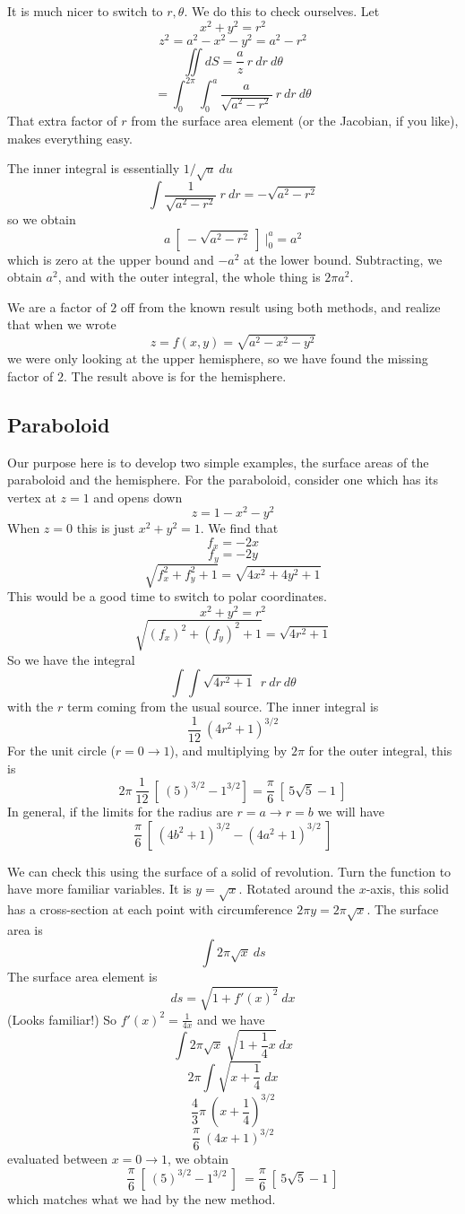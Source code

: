 \documentclass[11pt, oneside]{article}   	%
\begin{document}
It is much nicer to switch to $r,\theta$.  We do this to check ourselves. Let
\[ x^2 + y^2 = r^2 \]
\[ z^2 = a^2 - x^2 - y^2 = a^2 - r^2 \]
\[ \iint dS = \frac{a}{z} \ r \ dr \ d \theta \]
\[ = \int_0^{2 \pi} \int_0^a  \frac{a}{\sqrt{a^2 - r^2}} \ r \ dr \ d \theta \]
That extra factor of $r$ from the surface area element (or the Jacobian, if you like), makes everything easy.

The inner integral is essentially $1/\sqrt{u} \ du$
\[ \int \frac{1}{\sqrt{a^2 - r^2}} \ r \ dr = -\sqrt{a^2 - r^2}  \]
so we obtain
\[ a \ [ \ -\sqrt{a^2 - r^2} \ ] \ \bigg |_0^a = a^2 \]
which is zero at the upper bound and $-a^2$ at the lower bound.  Subtracting, we obtain $a^2$, and with the outer integral, the whole thing is $2 \pi a^2$.

We are a factor of $2$ off from the known result using both methods, and realize that when we wrote 
\[ z = f(x,y) = \sqrt{a^2 - x^2 - y^2} \]
we were only looking at the upper hemisphere, so we have found the missing factor of $2$.  The result above is for the hemisphere.

\subsection*{Paraboloid}
Our purpose here is to develop two simple examples, the surface areas of the paraboloid and the hemisphere.  For the paraboloid, consider one which has its vertex at $z=1$ and opens down
\[ z = 1 - x^2 - y^2 \]
When $z=0$ this is just $x^2 + y^2 = 1$.  We find that 
\[ f_x = -2x \]
\[ f_y = -2y \]
\[ \sqrt{f_x^2  + f_y^2 + 1} = \sqrt{4x^2 + 4y^2 + 1} \]
This would be a good time to switch to polar coordinates.
\[ x^2 + y^2 = r^2 \]
\[ \sqrt{(f_x)^2 + (f_y)^2 + 1} = \sqrt{4r^2 + 1} \]
 So we have the integral
\[ \int \int \sqrt{4r^2 + 1} \ \ r \ dr \ d \theta \]
with the $r$ term coming from the usual source. 
The inner integral is
\[ \frac{1}{12} \  (4r^2 + 1)^{3/2} \]
For the unit circle ($r=0 \rightarrow 1$), and multiplying by $2\pi$ for the outer integral, this is
\[ 2 \pi \ \frac{1}{12} \ [ \  (5)^{3/2} - 1^{3/2} ] = \frac{\pi}{6} \ [ \ 5 \sqrt{5} - 1 \ ] \]
In general, if the limits for the radius are $r=a \rightarrow r=b$ we will have
\[ \frac{\pi}{6}\ [ \ (4b^2 + 1)^{3/2} - (4a^2 + 1)^{3/2} \ ] \]

We can check this using the surface of a solid of revolution.  Turn the function to have more familiar variables.  It is $y=\sqrt{x}$.  Rotated around the $x$-axis, this solid has a cross-section at each point with circumference $2 \pi y = 2 \pi \sqrt{x}$.  The surface area is
\[ \int 2 \pi \sqrt{x} \ ds \]
The surface area element is 
\[ ds = \sqrt{1 + f'(x)^2} \ dx \]
(Looks familiar!)  So $f'(x)^2 = \frac{1}{4x}$ and we have
\[ \int 2 \pi \sqrt{x} \ \sqrt{1 + \frac{1}{4} x} \ dx \]
\[ 2 \pi \int \sqrt{x + \frac{1}{4}} \ dx \]
\[ \frac{4}{3} \pi \ (x + \frac{1}{4})^{3/2} \]
\[ \frac{\pi }{6} \ (4x + 1)^{3/2} \]
evaluated between $x=0 \rightarrow 1$, we obtain
\[ \frac{\pi }{6} \ [ \ (5)^{3/2} - 1^{3/2} \ ] \ = \frac{\pi}{6} \ [ \ 5 \sqrt{5} - 1 \ ] \]
which matches what we had by the new method.
\end{document}
